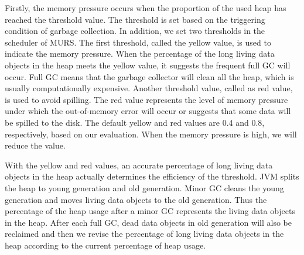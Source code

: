 Firstly, the memory pressure occurs when the proportion of the used heap has reached the threshold value. The threshold is set based on the triggering condition of garbage collection. In addition, we set two thresholds in the scheduler of MURS. The first threshold, called the yellow value, is used to indicate the memory pressure. When the percentage of the long living data objects in the heap meets the yellow value, it suggests the frequent full GC will occur. Full GC means that the garbage collector will clean all the heap, which is usually computationally expensive. Another threshold value, called as red value, is used to avoid spilling. The red value represents the level of memory pressure under which the out-of-memory error will occur or suggests that some data will be spilled to the disk. The default yellow and red values are 0.4 and 0.8, respectively, based on our evaluation. When the memory pressure is high, we will reduce the value.

With the yellow and red values, an accurate percentage of long living data objects in the heap actually determines the efficiency of the threshold. JVM splits the heap to young generation and old generation. Minor GC cleans the young generation and moves living data objects to the old generation. Thus the percentage of the heap usage after a minor GC represents the living data objects in the heap. After each full GC, dead data objects in old generation will also be reclaimed and then we revise the percentage of long living data objects in the heap according to the current percentage of heap usage.



